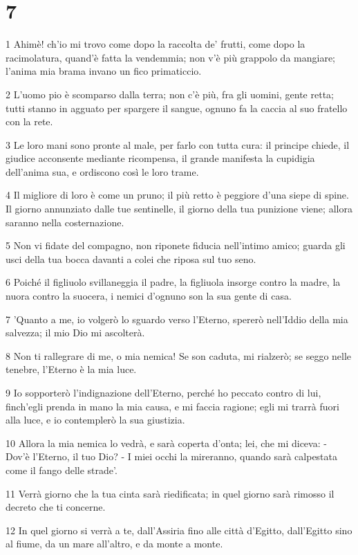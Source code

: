\chapter{7}

\par 1 Ahimè! ch'io mi trovo come dopo la raccolta de' frutti, come dopo la racimolatura, quand'è fatta la vendemmia; non v'è più grappolo da mangiare; l'anima mia brama invano un fico primaticcio.
\par 2 L'uomo pio è scomparso dalla terra; non c'è più, fra gli uomini, gente retta; tutti stanno in agguato per spargere il sangue, ognuno fa la caccia al suo fratello con la rete.
\par 3 Le loro mani sono pronte al male, per farlo con tutta cura: il principe chiede, il giudice acconsente mediante ricompensa, il grande manifesta la cupidigia dell'anima sua, e ordiscono così le loro trame.
\par 4 Il migliore di loro è come un pruno; il più retto è peggiore d'una siepe di spine. Il giorno annunziato dalle tue sentinelle, il giorno della tua punizione viene; allora saranno nella costernazione.
\par 5 Non vi fidate del compagno, non riponete fiducia nell'intimo amico; guarda gli usci della tua bocca davanti a colei che riposa sul tuo seno.
\par 6 Poiché il figliuolo svillaneggia il padre, la figliuola insorge contro la madre, la nuora contro la suocera, i nemici d'ognuno son la sua gente di casa.
\par 7 'Quanto a me, io volgerò lo sguardo verso l'Eterno, spererò nell'Iddio della mia salvezza; il mio Dio mi ascolterà.
\par 8 Non ti rallegrare di me, o mia nemica! Se son caduta, mi rialzerò; se seggo nelle tenebre, l'Eterno è la mia luce.
\par 9 Io sopporterò l'indignazione dell'Eterno, perché ho peccato contro di lui, finch'egli prenda in mano la mia causa, e mi faccia ragione; egli mi trarrà fuori alla luce, e io contemplerò la sua giustizia.
\par 10 Allora la mia nemica lo vedrà, e sarà coperta d'onta; lei, che mi diceva: - Dov'è l'Eterno, il tuo Dio? - I miei occhi la mireranno, quando sarà calpestata come il fango delle strade'.
\par 11 Verrà giorno che la tua cinta sarà riedificata; in quel giorno sarà rimosso il decreto che ti concerne.
\par 12 In quel giorno si verrà a te, dall'Assiria fino alle città d'Egitto, dall'Egitto sino al fiume, da un mare all'altro, e da monte a monte.
